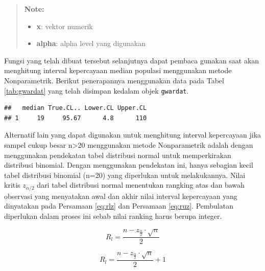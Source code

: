 \documentclass[]{book}
\newenvironment{Shaded}{\begin{snugshade}}{\end{snugshade}}
\newcommand{\KeywordTok}[1]{\textcolor[rgb]{0.13,0.29,0.53}{\textbf{#1}}}
\newcommand{\DataTypeTok}[1]{\textcolor[rgb]{0.13,0.29,0.53}{#1}}
\newcommand{\FloatTok}[1]{\textcolor[rgb]{0.00,0.00,0.81}{#1}}
\newcommand{\OperatorTok}[1]{\textcolor[rgb]{0.81,0.36,0.00}{\textbf{#1}}}
\newcommand{\NormalTok}[1]{#1}
\providecommand{\tightlist}{%
  \setlength{\itemsep}{0pt}\setlength{\parskip}{0pt}}
\begin{document}
\begin{quote}
\textbf{Note: }

\begin{itemize}
\tightlist
\item
  \textbf{x}: vektor numerik
\item
  \textbf{alpha}: alpha level yang digunakan
\end{itemize}
\end{quote}

Fungsi yang telah dibuat tersebut selanjutnya dapat pembaca gunakan saat
akan menghitung interval kepercayaan median populasi menggunakan metode
Nonparametrik. Berikut penerapannya menggunakan data pada Tabel
\ref{tab:gwardat} yang telah disimpan kedalam objek \texttt{gwardat}.

\begin{Shaded}
\end{Shaded}

\begin{verbatim}
##   median True.CL.. Lower.CL Upper.CL
## 1     19     95.67      4.8      110
\end{verbatim}

Alternatif lain yang dapat digunakan untuk menghitung interval
kepercayaan jika sampel cukup besar n\textgreater{}20 menggunakan metode
Nonparametrik adalah dengan menggunakan pendekatan tabel distribusi
normal untuk memperkirakan distribusi binomial. Dengan menggunakan
pendekatan ini, hanya sebagian kecil tabel distribusi binomial (n=20)
yang diperlukan untuk melakukannya. Nilai kritis \(z_{\alpha/2}\) dari
tabel distribusi normal menentukan rangking atas dan bawah observasi
yang menyatakan awal dan akhir nilai interval kepercayaan yang
dinyatakan pada Persamaan \eqref{eq:rlz} dan Persamaan \eqref{eq:ruz}.
Pembulatan diperlukan dalam proses ini sebab nilai ranking harus berupa
integer.

\begin{equation}
  R_l=\frac{n-z_{\frac{\alpha}{2}}\cdot\sqrt{n}}{2} 
  \label{eq:rlz}
\end{equation}

\begin{equation}
   R_l=\frac{n-z_{\frac{\alpha}{2}}\cdot\sqrt{n}}{2}+1
  \label{eq:ruz}
\end{equation}
\end{document}
